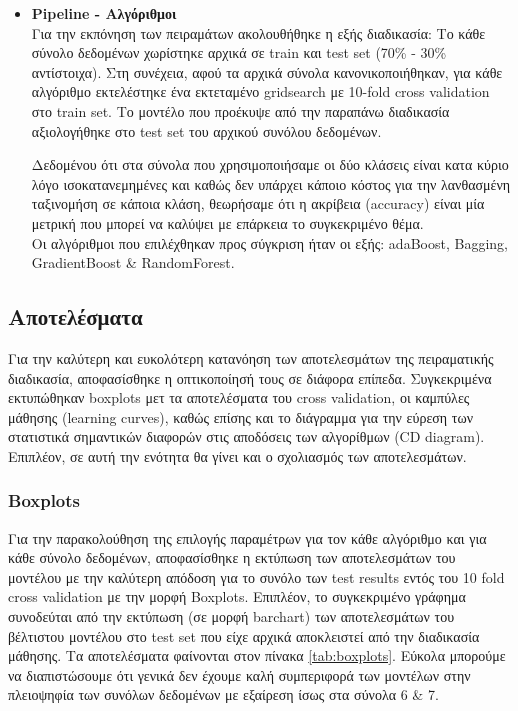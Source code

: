 \begin{itemize}
	
	\item \textbf{Pipeline - Αλγόριθμοι} \\
	 Για την εκπόνηση των πειραμάτων ακολουθήθηκε η εξής διαδικασία: Το κάθε σύνολο δεδομένων χωρίστηκε αρχικά σε train και test set (70\% - 30\% αντίστοιχα). Στη συνέχεια, αφού τα αρχικά σύνολα κανονικοποιήθηκαν, για κάθε αλγόριθμο εκτελέστηκε ένα εκτεταμένο gridsearch με 10-fold cross validation στο train set. Το μοντέλο που προέκυψε από την παραπάνω διαδικασία αξιολογήθηκε στο test set του αρχικού συνόλου δεδομένων. 
	 
	 Δεδομένου ότι στα σύνολα που χρησιμοποιήσαμε οι δύο κλάσεις είναι κατα κύριο λόγο ισοκατανεμημένες και καθώς δεν υπάρχει κάποιο κόστος για την λανθασμένη ταξινομήση σε κάποια κλάση, θεωρήσαμε ότι η ακρίβεια (accuracy) είναι μία μετρική που μπορεί να καλύψει με επάρκεια το συγκεκριμένο θέμα.\\
	 
    Οι αλγόριθμοι που επιλέχθηκαν προς σύγκριση ήταν οι εξής: adaBoost\footnotemark, Bagging\footnotemark[\value{footnote}], GradientBoost \& RandomForest.
	\\
	 
\end{itemize}

\subsection{Αποτελέσματα}
Για την καλύτερη και ευκολότερη κατανόηση των αποτελεσμάτων της πειραματικής διαδικασία, αποφασίσθηκε
η οπτικοποίησή τους σε διάφορα επίπεδα. Συγκεκριμένα εκτυπώθηκαν boxplots μετ τα αποτελέσματα του cross validation, οι καμπύλες μάθησης (learning curves), καθώς επίσης και το διάγραμμα για την εύρεση των στατιστικά σημαντικών διαφορών στις αποδόσεις των αλγορίθμων (CD diagram). Επιπλέον, σε αυτή την ενότητα θα γίνει και ο σχολιασμός των αποτελεσμάτων. 

\subsubsection{Boxplots}
Για την παρακολούθηση της επιλογής παραμέτρων για τον κάθε αλγόριθμο και για κάθε σύνολο δεδομένων, αποφασίσθηκε η εκτύπωση των αποτελεσμάτων του μοντέλου με την καλύτερη απόδοση για το συνόλο των test results εντός του 10 fold cross validation με την μορφή Boxplots. Επιπλέον, το συγκεκριμένο γράφημα συνοδεύται από την εκτύπωση (σε μορφή barchart) των αποτελεσμάτων του βέλτιστου μοντέλου στο test set που είχε αρχικά αποκλειστεί από την διαδικασία μάθησης. Τα αποτελέσματα φαίνονται στον πίνακα \ref{tab:boxplots}. Εύκολα μπορούμε να διαπιστώσουμε
ότι γενικά δεν έχουμε καλή συμπεριφορά των μοντέλων στην πλειοψηφία των συνόλων δεδομένων με εξαίρεση ίσως στα σύνολα 6 \& 7.


